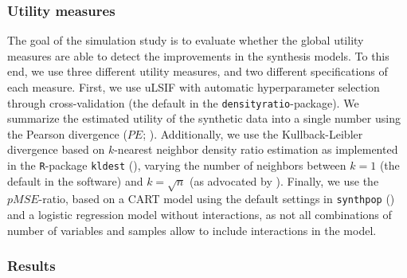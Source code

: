 \documentclass[
]{article}
\begin{document}
\subsubsection{Utility measures}\label{utility-measures}

The goal of the simulation study is to evaluate whether the global
utility measures are able to detect the improvements in the synthesis
models. To this end, we use three different utility measures, and two
different specifications of each measure. First, we use uLSIF with
automatic hyperparameter selection through cross-validation (the default
in the \texttt{densityratio}-package). We summarize the estimated
utility of the synthetic data into a single number using the Pearson
divergence (\(PE\); ). Additionally, we use the Kullback-Leibler divergence
based on \(k\)-nearest neighbor density ratio estimation as implemented
in the \texttt{R}-package \texttt{kldest} (), varying the number of neighbors between \(k = 1\) (the default
in the software) and \(k = \sqrt{n}\) (as advocated by
). Finally, we use the \(pMSE\)-ratio, based on a CART
model using the default settings in \texttt{synthpop}
() and a logistic
regression model without interactions, as not all combinations of number
of variables and samples allow to include interactions in the model.

\subsubsection{Results}\label{results}

\linespread{1}
\end{document}

